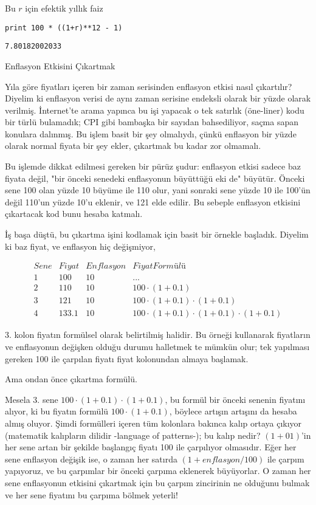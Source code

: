 \documentclass[12pt,fleqn]{article}\usepackage{../../common}
\begin{document}
Bu $r$ için efektik yıllık faiz

\begin{verbatim}
print 100 * ((1+r)**12 - 1)
\end{verbatim}

\begin{verbatim}
7.80182002033
\end{verbatim}

Enflasyon Etkisini Çıkartmak

Yıla göre fiyatları içeren bir zaman serisinden enflasyon etkisi nasıl
çıkartılır? Diyelim ki enflasyon verisi de aynı zaman serisine endeksli
olarak bir yüzde olarak verilmiş. İnternet'te arama yapınca bu işi yapacak
o tek satırlık (öne-liner) kodu bir türlü bulamadık; CPI gibi bambaşka bir
sayıdan bahsediliyor, saçma sapan konulara dalınmış. Bu işlem basit bir şey
olmalıydı, çünkü enflasyon bir yüzde olarak normal fiyata bir şey ekler,
çıkartmak bu kadar zor olmamalı.

Bu işlemde dikkat edilmesi gereken bir pürüz şudur: enflasyon etkisi sadece
baz fiyata değil, "bir önceki senedeki enflasyonun büyüttüğü eki de"
büyütür. Önceki sene 100 olan yüzde 10 büyüme ile 110 olur, yani sonraki
sene yüzde 10 ile 100'ün değil 110'un yüzde 10'u eklenir, ve 121 elde
edilir. Bu sebeple enflasyon etkisini çıkartacak kod bunu hesaba katmalı.

İş başa düştü, bu çıkartma işini kodlamak için basit bir örnekle
başladık. Diyelim ki baz fiyat, ve enflasyon hiç değişmiyor,

$$
\begin{array}{cccc}
Sene & Fiyat & Enflasyon & Fiyat Formülü \\
\hline
1 & 100 & 10 & ... \\
2 &   110  &   10   & 100 \cdot (1+0.1) \\
3 &   121   &  10   & 100 \cdot (1+0.1) \cdot (1+0.1) \\
4 &   133.1 &  10   & 100 \cdot (1+0.1) \cdot (1+0.1) \cdot (1+0.1) 
\end{array}
$$

3. kolon fiyatın formülsel olarak belirtilmiş halidir. Bu örneği kullanarak
fiyatların ve enflasyonun değişken olduğu durumu halletmek te mümkün olur;
tek yapılması gereken 100 ile çarpılan fiyatı fiyat kolonundan almaya
başlamak.

Ama ondan önce çıkartma formülü.

Mesela 3. sene $100 \cdot (1+0.1) \cdot (1+0.1)$, bu formül bir önceki
senenin fiyatını alıyor, ki bu fiyatın formülü $100 \cdot (1+0.1)$, böylece
artışın artışını da hesaba almış oluyor. Şimdi formülleri içeren tüm
kolonlara bakınca kalıp ortaya çıkıyor (matematik kalıpların dilidir
-language of patterns-); bu kalıp nedir? $(1+01)$'in her sene artan bir
şekilde başlangıç fiyatı 100 ile çarpılıyor olmasıdır. Eğer her sene
enflasyon değişik ise, o zaman her satırda $(1+enflasyon/100)$ ile çarpım
yapıyoruz, ve bu çarpımlar bir önceki çarpıma eklenerek büyüyorlar. O zaman
her sene enflasyonun etkisini çıkartmak için bu çarpım zincirinin ne
olduğunu bulmak ve her sene fiyatını bu çarpıma bölmek yeterli!
\end{document}
